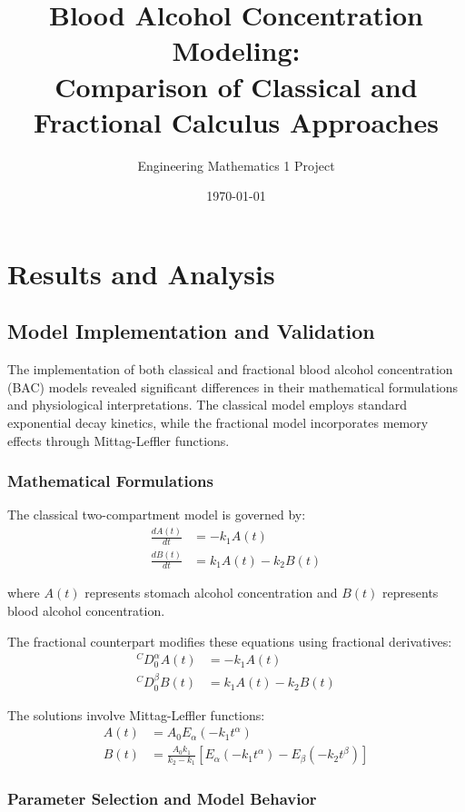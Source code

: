 \documentclass[12pt]{article}
\title{Blood Alcohol Concentration Modeling:\\Comparison of Classical and Fractional Calculus Approaches}
\author{Engineering Mathematics 1 Project}
\date{\today}
\begin{document}
\maketitle

\section{Results and Analysis}

\subsection{Model Implementation and Validation}

The implementation of both classical and fractional blood alcohol concentration (BAC) models revealed significant differences in their mathematical formulations and physiological interpretations. The classical model employs standard exponential decay kinetics, while the fractional model incorporates memory effects through Mittag-Leffler functions.

\subsubsection{Mathematical Formulations}

The classical two-compartment model is governed by:
\begin{align}
\frac{dA(t)}{dt} &= -k_1 A(t) \\
\frac{dB(t)}{dt} &= k_1 A(t) - k_2 B(t)
\end{align}

where $A(t)$ represents stomach alcohol concentration and $B(t)$ represents blood alcohol concentration.

The fractional counterpart modifies these equations using fractional derivatives:
\begin{align}
{}^C D_0^{\alpha} A(t) &= -k_1 A(t) \\
{}^C D_0^{\beta} B(t) &= k_1 A(t) - k_2 B(t)
\end{align}

The solutions involve Mittag-Leffler functions:
\begin{align}
A(t) &= A_0 E_{\alpha}(-k_1 t^{\alpha}) \\
B(t) &= \frac{A_0 k_1}{k_2 - k_1} \left[E_{\alpha}(-k_1 t^{\alpha}) - E_{\beta}(-k_2 t^{\beta})\right]
\end{align}

\subsubsection{Parameter Selection and Model Behavior}
\end{document}
